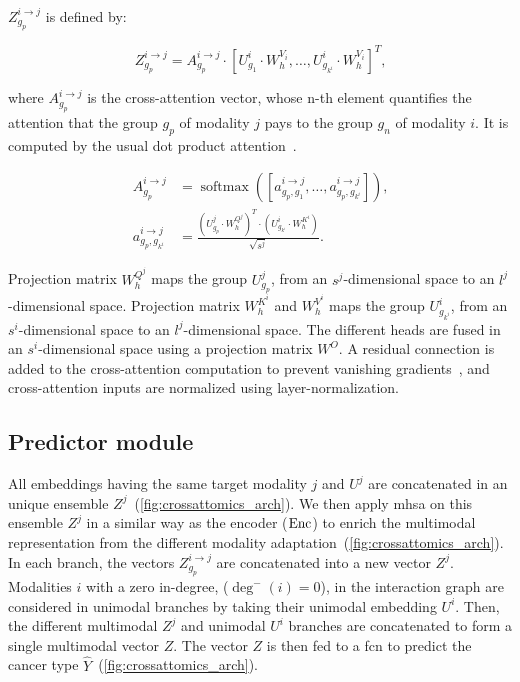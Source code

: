 \documentclass[../main.tex]{subfiles}
\begin{document}
		\(Z^{i\rightarrow j}_{g_p}\) is defined by:

		\begin{equation}
			Z^{i\rightarrow j}_{g_p} = A^{i\rightarrow j}_{g_p} \cdot {\left[ U^{i}_{g_1} \cdot W_{h}^{V_i}, \ldots ,  U^{i}_{g_{k^i}} \cdot W_{h}^{V_i}\right]}^T \text{,} \label{eq:cross_att}
		\end{equation}

		where \(A^{i\rightarrow j}_{g_p}\) is the cross-attention vector, whose n-th element quantifies the attention that the group \(g_p\) of modality \(j\) pays to the group \(g_n\) of modality \(i\).
		It is computed by the usual dot product attention~\cite{AttentionAllYouNeed}.

		\begin{align}
			A^{i\rightarrow j}_{g_p}         & = \operatorname{softmax}\left( \left[ a^{i\rightarrow j}_{g_p,g_1}, \ldots, a^{i\rightarrow j}_{g_p,g_{k^i}} \right] \right) \text{,} \label{eq:cross_att_weights} \\
			a^{i\rightarrow j}_{g_p,g_{k^i}} & = \frac{{\left(U^{j}_{g_p} \cdot W_{h}^{Q^j}\right)}^T \cdot \left(U^{i}_{g_{k^i}} \cdot W_{h}^{K^i} \right)}{\sqrt{s^{j}}} \text{.}\label{eq:cross_att_weight}
		\end{align}

		Projection matrix \(W^{Q^j}_{h}\) maps the group \(U^{j}_{g_p}\), from an \(s^j\)-dimensional space to an \(l^j\)-dimensional space.
		Projection matrix \(W^{K^i}_{h}\) and \(W^{V^i}_{h}\) maps the group \(U^{i}_{g_{k^i}}\), from an \(s^i\)-dimensional space to an \(l^j\)-dimensional space.
		The different heads are fused in an \(s^{i}\)-dimensional space using a projection matrix \(W^O\).
		A residual connection is added to the cross-attention computation to prevent vanishing gradients~\cite{AttentionAllYouNeed}, and cross-attention inputs are normalized using layer-normalization.

	\subsection{Predictor module}
		All embeddings having the same target modality \(j\) and \(U^j\) are concatenated in an unique ensemble \(Z^j\)~(\cref{fig:crossattomics_arch}).
		We then apply \gls{mhsa} on this ensemble \(Z^j\) in a similar way as the encoder (\(\operatorname{Enc}\)) to enrich the multimodal representation from the different modality adaptation~(\cref{fig:crossattomics_arch}).
		In each branch, the vectors \(Z^{i\rightarrow j}_{g_p}\) are concatenated into a new vector \(Z^j\).
		Modalities \(i\) with a zero in-degree, (\(\deg^{-}\left(i\right) = 0\)), in the interaction graph are considered in unimodal branches by taking their unimodal embedding \(U^i\).
		Then, the different multimodal \(Z^j\) and unimodal \(U^i\) branches are concatenated to form a single multimodal vector \(Z\).
		The vector \(Z\) is then fed to a \gls{fcn} to predict the cancer type \(\hat{Y}\)~(\cref{fig:crossattomics_arch}).
\end{document}
